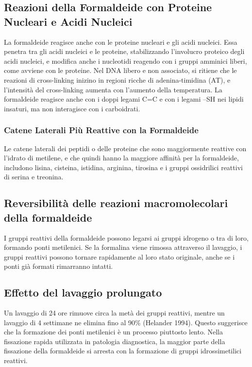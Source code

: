 \subsection{Reazioni della Formaldeide con Proteine Nucleari e Acidi Nucleici}
La formaldeide reagisce anche con le proteine nucleari e gli acidi nucleici. Essa penetra tra gli acidi nucleici e le proteine, stabilizzando l'involucro proteico degli acidi nucleici, e modifica anche i nucleotidi reagendo con i gruppi amminici liberi, come avviene con le proteine. Nel DNA libero e non associato, si ritiene che le reazioni di cross-linking inizino in regioni ricche di adenina-timidina (AT), e l'intensità del cross-linking aumenta con l'aumento della temperatura. La formaldeide reagisce anche con i doppi legami C=C e con i legami –SH nei lipidi insaturi, ma non interagisce con i carboidrati.

\subsubsection{Catene Laterali Più Reattive con la Formaldeide}
Le catene laterali dei peptidi o delle proteine che sono maggiormente reattive con l'idrato di metilene, e che quindi hanno la maggiore affinità per la formaldeide, includono lisina, cisteina, istidina, arginina, tirosina e i gruppi ossidrilici reattivi di serina e treonina.


\subsection{Reversibilità delle reazioni macromolecolari della formaldeide}
I gruppi reattivi della formaldeide possono legarsi ai gruppi idrogeno o tra di loro, formando ponti metilenici. Se la formalina viene rimossa attraverso il lavaggio, i gruppi reattivi possono tornare rapidamente al loro stato originale, anche se i ponti già formati rimarranno intatti.

\subsection{Effetto del lavaggio prolungato}
Un lavaggio di 24 ore rimuove circa la metà dei gruppi reattivi, mentre un lavaggio di 4 settimane ne elimina fino al 90\% (Helander 1994). Questo suggerisce che la formazione dei ponti metilenici è un processo piuttosto lento. Nella fissazione rapida utilizzata in patologia diagnostica, la maggior parte della fissazione della formaldeide si arresta con la formazione di gruppi idrossimetilici reattivi.


